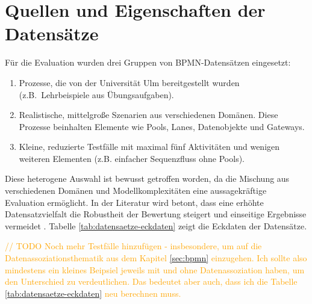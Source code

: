 \section{Quellen und Eigenschaften der Datensätze}\label{sec:quellen-und-eigenschaften-der-datensatze}

Für die Evaluation wurden drei Gruppen von \ac{BPMN}-Datensätzen eingesetzt:

\begin{enumerate}
    \item Prozesse, die von der Universität Ulm bereitgestellt wurden (z.B.\ Lehrbeispiele aus Übungsaufgaben).
    \item Realistische, mittelgroße Szenarien aus verschiedenen Domänen. Diese Prozesse beinhalten Elemente wie Pools, Lanes, Datenobjekte und Gateways.
    \item Kleine, reduzierte Testfälle mit maximal fünf Aktivitäten und wenigen weiteren Elementen (z.B. einfacher Sequenzfluss ohne Pools).
\end{enumerate}

Diese heterogene Auswahl ist bewusst getroffen worden, da die Mischung aus verschiedenen Domänen und Modellkomplexitäten eine aussagekräftige Evaluation ermöglicht. In der Literatur wird betont, dass eine erhöhte Datensatzvielfalt die Robustheit der Bewertung steigert und einseitige Ergebnisse vermeidet \cite{blake2025datasetdiversity}. Tabelle \ref{tab:datensaetze-eckdaten} zeigt die Eckdaten der Datensätze.

\textcolor{orange}{// TODO Noch mehr Testfälle hinzufügen - insbesondere, um auf die Datenassoziationsthematik aus dem Kapitel \ref{sec:bpmn} einzugehen. Ich sollte also mindestens ein kleines Beipsiel jeweils mit und ohne Datenassoziation haben, um den Unterschied zu verdeutlichen. Das bedeutet aber auch, dass ich die Tabelle \ref{tab:datensaetze-eckdaten} neu berechnen muss.}

